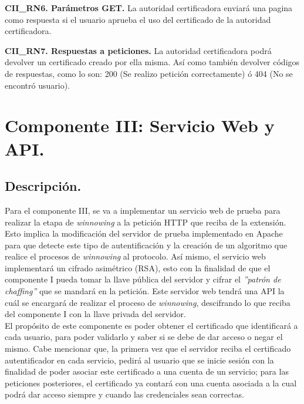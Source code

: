 \documentclass[12pt, a4paper, titlepage]{report}
\begin{document}
            \textbf{CII\_RN6. Parámetros GET.} La autoridad certificadora enviará una pagina como respuesta si el usuario aprueba el uso del certificado de la autoridad certificadora.\\
            \label{CII_RN6}
            
            \textbf{CII\_RN7. Respuestas a peticiones.} La autoridad certificadora podrá devolver un certificado creado por ella misma. Así como también devolver códigos de respuestas, como lo son: 200 (Se realizo petición correctamente) ó 404 (No se encontró usuario).\\
            \label{CII_RN7}
			
	       
	       \section{Componente III: Servicio Web y API.}
	        \subsection{Descripción.}
	        Para el componente III, se va a implementar un servicio web de prueba para realizar la etapa de \textit{winnowing} a la petición HTTP que reciba de la extensión. Esto implica la modificación del servidor de prueba implementado en Apache para que detecte este tipo de autentificación y la creación de un algoritmo que realice el procesos de \textit{winnowing} al protocolo. 
	        Así mismo, el servicio web implementará un cifrado asimétrico (RSA), esto con la finalidad de que el componente I pueda tomar la llave pública del servidor y cifrar el \textit{''patrón de chaffing''} que se mandará en la petición. Este servidor web tendrá una API la cuál se encargará de realizar el proceso de \textit{winnowing}, descifrando lo que reciba del componente I con la llave privada del servidor.\\
            
            El propósito de este componente es poder obtener el certificado que identificará a cada usuario, para poder validarlo y saber si se debe de dar acceso o negar el mismo. Cabe mencionar que, la primera vez que el servidor reciba el certificado autentificador en cada servicio, pedirá al usuario que se inicie sesión con la finalidad de poder asociar este certificado a una cuenta de un servicio; para las peticiones posteriores, el certificado ya contará con una cuenta asociada a la cual podrá dar acceso siempre y cuando las credenciales sean correctas.\\
            
\end{document}

